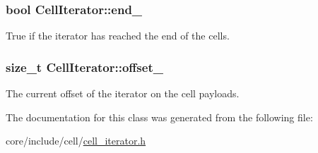 \subsubsection[{end\+\_\+}]{\setlength{\rightskip}{0pt plus 5cm}bool Cell\+Iterator\+::end\+\_\+\hspace{0.3cm}{\ttfamily [private]}}\label{classCellIterator_a0b564d0f71aec08b0d5e1e89565d4f13}
True if the iterator has reached the end of the cells. \hypertarget{classCellIterator_a65359a2c02df2e1350e1f41de9a9c832}{}
\subsubsection[{offset\+\_\+}]{\setlength{\rightskip}{0pt plus 5cm}size\+\_\+t Cell\+Iterator\+::offset\+\_\+\hspace{0.3cm}{\ttfamily [private]}}\label{classCellIterator_a65359a2c02df2e1350e1f41de9a9c832}
The current offset of the iterator on the cell payloads. 

The documentation for this class was generated from the following file\+:\begin{DoxyCompactItemize}
\item 
core/include/cell/\hyperlink{cell__iterator_8h}{cell\+\_\+iterator.\+h}\end{DoxyCompactItemize}
